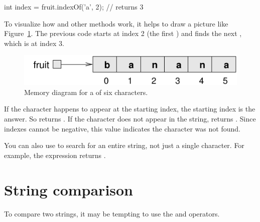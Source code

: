 \begin{code}
int index = fruit.indexOf('a', 2);  // returns 3
\end{code}

To visualize how  and other  methods work, it helps to draw a picture like Figure~\ref{fig.banana}.
The previous code starts at index 2 (the first ) and finds the next , which is at index 3.


\begin{figure}[!ht]
\begin{center}
\includegraphics{figs/banana.pdf}
\caption{Memory diagram for a  of six characters.}
\label{fig.banana}
\end{center}
\end{figure}


If the character happens to appear at the starting index, the starting index is the answer.
So  returns .
If the character does not appear in the string,  returns .
Since indexes cannot be negative, this value indicates the character was not found.

You can also use  to search for an entire string, not just a single character.
For example, the expression  returns .


\section{String comparison}
\label{strcmp}


To compare two strings, it may be tempting to use the \java{==} and \java{!=} operators.

